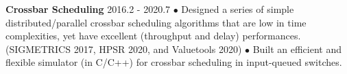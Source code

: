 \documentclass[line,11pt,letter]{includes/cls/myRes}
\begin{document}
\begin{resume}
{\setlength{\parskip}{0pt}
{\bf Crossbar Scheduling} \hfill 2016.2 - 2020.7\break
{\hspace*{1em} $\bullet$ Designed a series of simple distributed/parallel crossbar scheduling algorithms that are low in time complexities, yet have excellent (throughput and delay) performances. (SIGMETRICS 2017, HPSR 2020, and Valuetools 2020)\hfill\break}
{\hspace*{1em} $\bullet$ Built an efficient and flexible simulator (in C/C++) for crossbar scheduling in input-queued switches.\hfill\break}
\sspace
}


\end{resume}
\end{document}
